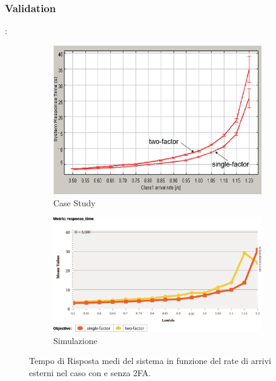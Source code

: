 \subsubsection{Validation}
\begin{frame}{\subsecname: \subsubsecname}
\begin{figure}
    \centering
    \begin{subfigure}{0.49\linewidth}
        \centering
        \includegraphics[width=1\linewidth]{figs/results/obj2/validation/casestudy_system_rtime.png}
        \caption{Case Study \citep{DBLP:books/sp/Serazzi24}}
        \label{fig:Single_VS_Two_FA_Perfomance_Comparison_population}
    \end{subfigure}
    \begin{subfigure}{0.49\linewidth}
        \centering
        \includegraphics[width=1\linewidth]{figs/results/obj2/validation/single_VS_Two_FA_Perfomance_Comparison_rtime.png}
        \caption{Simulazione}
        \label{fig:Single_VS_Two_FA_Perfomance_Comparison_rtime}
    \end{subfigure}
    \caption{Tempo di Risposta medi del sistema in funzione del rate di arrivi esterni nel caso con e senza 2FA.}
    \label{fig:Single_VS_Two_FA_Perfomance_Comparison}
\end{figure}
\end{frame}

